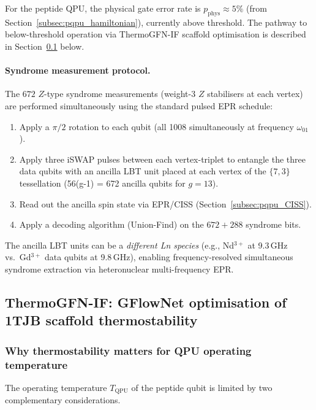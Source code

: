 \documentclass[11pt,oneside]{amsbook}
\numberwithin{equation}{section}
\theoremstyle{plain}
\theoremstyle{definition}
\theoremstyle{remark}
\begin{document}
For the peptide QPU, the physical gate error rate is $p_{\mathrm{phys}}
\approx 5\%$ (from Section~\ref{subsec:pqpu_hamiltonian}), currently above
threshold.  The pathway to below-threshold operation via ThermoGFN-IF
scaffold optimisation is described in Section~\ref{subsec:thermogfn_if} below.

\paragraph{Syndrome measurement protocol.}
The $672$ $Z$-type syndrome measurements (weight-$3$ $Z$ stabilisers at
each vertex) are performed simultaneously using the standard pulsed EPR
schedule:
\begin{enumerate}[label=\rm(\arabic*)]
\item Apply a $\pi/2$ rotation to each qubit (all 1008 simultaneously at
  frequency $\omega_{01}$).
\item Apply three iSWAP pulses between each vertex-triplet to entangle the
  three data qubits with an ancilla LBT unit placed at each vertex of the
  $\{7,3\}$ tessellation (56(g-1) = 672 ancilla qubits for $g=13$).
\item Read out the ancilla spin state via EPR/CISS (Section~\ref{subsec:pqpu_CISS}).
\item Apply a decoding algorithm (Union-Find) on the $672+288$ syndrome bits.
\end{enumerate}

The ancilla LBT units can be a \emph{different Ln species} (e.g., Nd$^{3+}$
at 9.3\,GHz vs.\ Gd$^{3+}$ data qubits at 9.8\,GHz), enabling
frequency-resolved simultaneous syndrome extraction via heteronuclear
multi-frequency EPR.

\subsection{ThermoGFN-IF: GFlowNet optimisation of 1TJB scaffold
  thermostability}
\label{subsec:thermogfn_if}

\subsubsection{Why thermostability matters for QPU operating temperature}

The operating temperature $T_{\mathrm{QPU}}$ of the peptide qubit is limited
by two complementary considerations.
\end{document}

